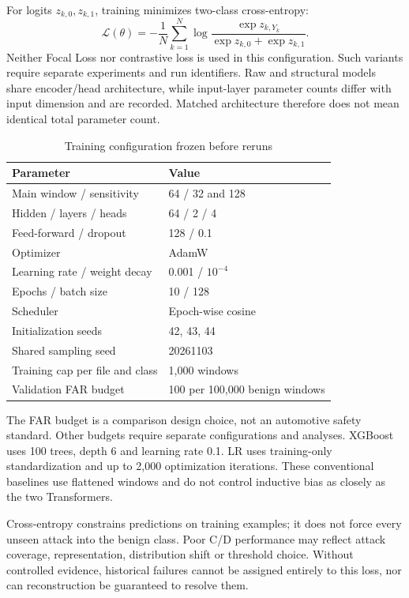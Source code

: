 \documentclass[12pt,a4paper,oneside,openany]{extbook}
\begin{document}
For logits $z_{k,0},z_{k,1}$, training minimizes two-class cross-entropy:
\begin{equation}
\mathcal L(\theta)=-\frac1N\sum_{k=1}^N\log\frac{\exp z_{k,Y_k}}{\exp z_{k,0}+\exp z_{k,1}}.
\end{equation}
Neither Focal Loss nor contrastive loss is used in this configuration. Such variants require separate experiments and run identifiers. Raw and structural models share encoder/head architecture, while input-layer parameter counts differ with input dimension and are recorded. Matched architecture therefore does not mean identical total parameter count.

\begin{table}[htbp]\centering
\caption{Training configuration frozen before reruns}\label{tab:config}
\begin{tabular}{ll}\toprule Parameter & Value\\\midrule
Main window / sensitivity & 64 / 32 and 128\\
Hidden / layers / heads & 64 / 2 / 4\\
Feed-forward / dropout & 128 / 0.1\\
Optimizer & AdamW\\
Learning rate / weight decay & 0.001 / $10^{-4}$\\
Epochs / batch size & 10 / 128\\
Scheduler & Epoch-wise cosine\\
Initialization seeds & 42, 43, 44\\
Shared sampling seed & 20261103\\
Training cap per file and class & 1,000 windows\\
Validation FAR budget & 100 per 100,000 benign windows\\\bottomrule\end{tabular}
\end{table}

The FAR budget is a comparison design choice, not an automotive safety standard. Other budgets require separate configurations and analyses. XGBoost uses 100 trees, depth 6 and learning rate 0.1. LR uses training-only standardization and up to 2,000 optimization iterations. These conventional baselines use flattened windows and do not control inductive bias as closely as the two Transformers.

Cross-entropy constrains predictions on training examples; it does not force every unseen attack into the benign class. Poor C/D performance may reflect attack coverage, representation, distribution shift or threshold choice. Without controlled evidence, historical failures cannot be assigned entirely to this loss, nor can reconstruction be guaranteed to resolve them.
\end{document}
